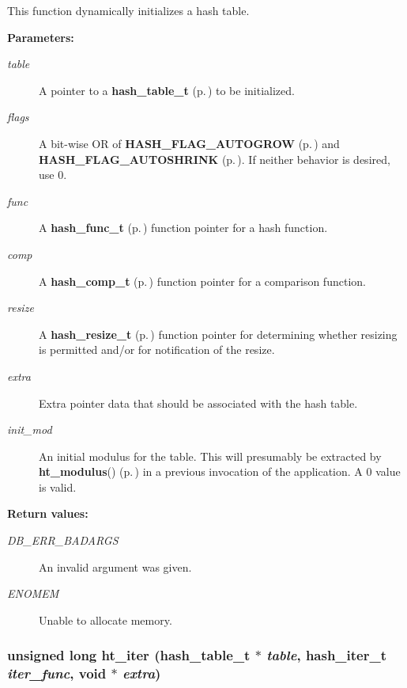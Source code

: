  This function dynamically initializes a hash table.\begin{Desc}
\item[{\bf Parameters: }]\par
\begin{description}
\item[
{\em table}]A pointer to a {\bf hash\_\-table\_\-t} {\rm (p.\,\pageref{group__dbprim__hash_a0})} to be initialized. \item[
{\em flags}]A bit-wise OR of {\bf HASH\_\-FLAG\_\-AUTOGROW} {\rm (p.\,\pageref{group__dbprim__hash_a16})} and {\bf HASH\_\-FLAG\_\-AUTOSHRINK} {\rm (p.\,\pageref{group__dbprim__hash_a17})}. If neither behavior is desired, use 0. \item[
{\em func}]A {\bf hash\_\-func\_\-t} {\rm (p.\,\pageref{group__dbprim__hash_a3})} function pointer for a hash function. \item[
{\em comp}]A {\bf hash\_\-comp\_\-t} {\rm (p.\,\pageref{group__dbprim__hash_a4})} function pointer for a comparison function. \item[
{\em resize}]A {\bf hash\_\-resize\_\-t} {\rm (p.\,\pageref{group__dbprim__hash_a5})} function pointer for determining whether resizing is permitted and/or for notification of the resize. \item[
{\em extra}]Extra pointer data that should be associated with the hash table. \item[
{\em init\_\-mod}]An initial modulus for the table. This will presumably be extracted by {\bf ht\_\-modulus}() {\rm (p.\,\pageref{group__dbprim__hash_a22})} in a previous invocation of the application. A 0 value is valid.\end{description}
\end{Desc}
\begin{Desc}
\item[{\bf Return values: }]\par
\begin{description}
\item[
{\em DB\_\-ERR\_\-BADARGS}]An invalid argument was given. \item[
{\em ENOMEM}]Unable to allocate memory. \end{description}
\end{Desc}
\subsubsection{\setlength{\rightskip}{0pt plus 5cm}unsigned long ht\_\-iter ({\bf hash\_\-table\_\-t} $\ast$ {\em table}, {\bf hash\_\-iter\_\-t} {\em iter\_\-func}, void $\ast$ {\em extra})}\label{group__dbprim__hash_a11}




